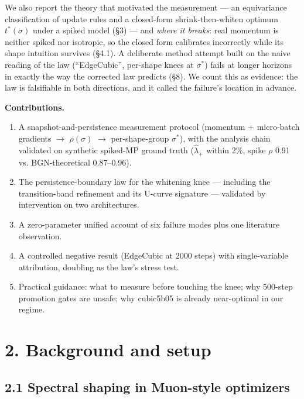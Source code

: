 \documentclass[
]{article}
\providecommand{\tightlist}{%
  \setlength{\itemsep}{0pt}\setlength{\parskip}{0pt}}
\begin{document}
We also report the theory that motivated the measurement --- an
equivariance classification of update rules and a closed-form
shrink-then-whiten optimum \(t^*(\sigma)\) under a spiked model (§3) ---
and \emph{where it breaks}: real momentum is neither spiked nor
isotropic, so the closed form calibrates incorrectly while its shape
intuition survives (§4.1). A deliberate method attempt built on the
naive reading of the law (``EdgeCubic'', per-shape knees at
\(\sigma^*\)) fails at longer horizons in exactly the way the corrected
law predicts (§8). We count this as evidence: the law is falsifiable in
both directions, and it called the failure's location in advance.

\textbf{Contributions.}

\begin{enumerate}
\def\labelenumi{\arabic{enumi}.}
\tightlist
\item
  A snapshot-and-persistence measurement protocol (momentum +
  micro-batch gradients \(\to\) \(\rho(\sigma)\) \(\to\) per-shape-group
  \(\sigma^*\)), with the analysis chain validated on synthetic
  spiked-MP ground truth (\(\hat{\lambda}_+\) within 2\%, spike \(\rho\)
  0.91 vs. BGN-theoretical 0.87--0.96).
\item
  The persistence-boundary law for the whitening knee --- including the
  transition-band refinement and its U-curve signature --- validated by
  intervention on two architectures.
\item
  A zero-parameter unified account of six failure modes plus one
  literature observation.
\item
  A controlled negative result (EdgeCubic at 2000 steps) with
  single-variable attribution, doubling as the law's stress test.
\item
  Practical guidance: what to measure before touching the knee; why
  500-step promotion gates are unsafe; why cubic5b05 is already
  near-optimal in our regime.
\end{enumerate}

\section{2. Background and setup}\label{background-and-setup}

\subsection{2.1 Spectral shaping in Muon-style
optimizers}\label{spectral-shaping-in-muon-style-optimizers}
\end{document}
